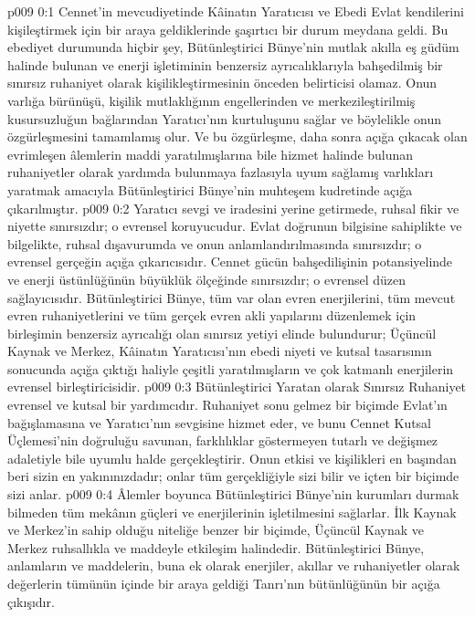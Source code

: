 \vs p009 0:1 Cennet’in mevcudiyetinde Kâinatın Yaratıcısı ve Ebedi Evlat kendilerini kişileştirmek için bir araya geldiklerinde şaşırtıcı bir durum meydana geldi. Bu ebediyet durumunda hiçbir şey, Bütünleştirici Bünye’nin mutlak akılla eş güdüm halinde bulunan ve enerji işletiminin benzersiz ayrıcalıklarıyla bahşedilmiş bir sınırsız ruhaniyet olarak kişilikleştirmesinin önceden belirticisi olamaz. Onun varlığa bürünüşü, kişilik mutlaklığının engellerinden ve merkezileştirilmiş kusursuzluğun bağlarından Yaratıcı’nın kurtuluşunu sağlar ve böylelikle onun özgürleşmesini tamamlamış olur. Ve bu özgürleşme, daha sonra açığa çıkacak olan evrimleşen âlemlerin maddi yaratılmışlarına bile hizmet halinde bulunan ruhaniyetler olarak yardımda bulunmaya fazlasıyla uyum sağlamış varlıkları yaratmak amacıyla Bütünleştirici Bünye’nin muhteşem kudretinde açığa çıkarılmıştır.
\vs p009 0:2 Yaratıcı sevgi ve iradesini yerine getirmede, ruhsal fikir ve niyette sınırsızdır; o evrensel koruyucudur. Evlat doğrunun bilgisine sahiplikte ve bilgelikte, ruhsal dışavurumda ve onun anlamlandırılmasında sınırsızdır; o evrensel gerçeğin açığa çıkarıcısıdır. Cennet gücün bahşedilişinin potansiyelinde ve enerji üstünlüğünün büyüklük ölçeğinde sınırsızdır; o evrensel düzen sağlayıcısıdır. Bütünleştirici Bünye, tüm var olan evren enerjilerini, tüm mevcut evren ruhaniyetlerini ve tüm gerçek evren akli yapılarını düzenlemek için birleşimin benzersiz ayrıcalığı olan sınırsız yetiyi elinde bulundurur; Üçüncül Kaynak ve Merkez, Kâinatın Yaratıcısı’nın ebedi niyeti ve kutsal tasarısının sonucunda açığa çıktığı haliyle çeşitli yaratılmışların ve çok katmanlı enerjilerin evrensel birleştiricisidir.
\vs p009 0:3 Bütünleştirici Yaratan olarak Sınırsız Ruhaniyet evrensel ve kutsal bir yardımcıdır. Ruhaniyet sonu gelmez bir biçimde Evlat’ın bağışlamasına ve Yaratıcı’nın sevgisine hizmet eder, ve bunu Cennet Kutsal Üçlemesi’nin doğruluğu savunan, farklılıklar göstermeyen tutarlı ve değişmez adaletiyle bile uyumlu halde gerçekleştirir. Onun etkisi ve kişilikleri en başından beri sizin en yakınınızdadır; onlar tüm gerçekliğiyle sizi bilir ve içten bir biçimde sizi anlar.
\vs p009 0:4 Âlemler boyunca Bütünleştirici Bünye’nin kurumları durmak bilmeden tüm mekânın güçleri ve enerjilerinin işletilmesini sağlarlar. İlk Kaynak ve Merkez’in sahip olduğu niteliğe benzer bir biçimde, Üçüncül Kaynak ve Merkez ruhsallıkla ve maddeyle etkileşim halindedir. Bütünleştirici Bünye, anlamların ve maddelerin, buna ek olarak enerjiler, akıllar ve ruhaniyetler olarak değerlerin tümünün içinde bir araya geldiği Tanrı’nın bütünlüğünün bir açığa çıkışıdır.
